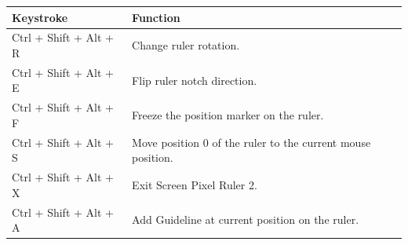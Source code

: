 \documentclass[
]{book}
\begin{document}
\begin{longtable}[]{@{}ll@{}}
\toprule
\begin{minipage}[b]{0.27\columnwidth}\raggedright
Keystroke\strut
\end{minipage} & \begin{minipage}[b]{0.68\columnwidth}\raggedright
Function\strut
\end{minipage}\tabularnewline
\midrule
\endhead
\begin{minipage}[t]{0.27\columnwidth}\raggedright
Ctrl + Shift + Alt + R\strut
\end{minipage} & \begin{minipage}[t]{0.68\columnwidth}\raggedright
Change ruler rotation.\strut
\end{minipage}\tabularnewline
\begin{minipage}[t]{0.27\columnwidth}\raggedright
Ctrl + Shift + Alt + E\strut
\end{minipage} & \begin{minipage}[t]{0.68\columnwidth}\raggedright
Flip ruler notch direction.\strut
\end{minipage}\tabularnewline
\begin{minipage}[t]{0.27\columnwidth}\raggedright
Ctrl + Shift + Alt + F\strut
\end{minipage} & \begin{minipage}[t]{0.68\columnwidth}\raggedright
Freeze the position marker on the ruler.\strut
\end{minipage}\tabularnewline
\begin{minipage}[t]{0.27\columnwidth}\raggedright
Ctrl + Shift + Alt + S\strut
\end{minipage} & \begin{minipage}[t]{0.68\columnwidth}\raggedright
Move position 0 of the ruler to the current mouse position.\strut
\end{minipage}\tabularnewline
\begin{minipage}[t]{0.27\columnwidth}\raggedright
Ctrl + Shift + Alt + X\strut
\end{minipage} & \begin{minipage}[t]{0.68\columnwidth}\raggedright
Exit Screen Pixel Ruler 2.\strut
\end{minipage}\tabularnewline
\begin{minipage}[t]{0.27\columnwidth}\raggedright
Ctrl + Shift + Alt + A\strut
\end{minipage} & \begin{minipage}[t]{0.68\columnwidth}\raggedright
Add Guideline at current position on the ruler.\strut

\end{minipage}
\end{longtable}
\end{document}
